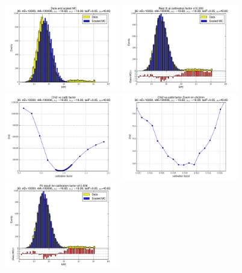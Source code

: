 
 \begin{figure}[htbp] \begin{center} 
\includegraphics[width=0.45\textwidth]{../FIGURES/30/FIG_Data_and_scaled_MC.pdf} 
\includegraphics[width=0.45\textwidth]{../FIGURES/30/FIG_Best_fit_at_calibration_factor_of_0_930.pdf} 
\includegraphics[width=0.45\textwidth]{../FIGURES/30/FIG_Chi2_vs_calib_factor.pdf} 
\includegraphics[width=0.45\textwidth]{../FIGURES/30/FIG_Chi2_vs_calib_factor_Zoom_on_chi2min.pdf} 
\includegraphics[width=0.45\textwidth]{../FIGURES/30/FIG_Fit_result_for_calibration_factor_of_0_936.pdf} 

\end{center}
\end{figure}
